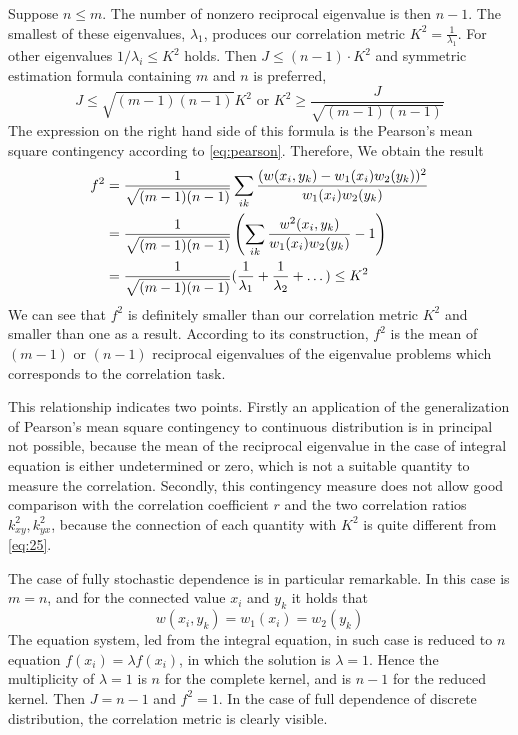 \documentclass{article}
\begin{document}
Suppose $n\leq m$. The number of nonzero reciprocal eigenvalue is
then $n-1$.
The smallest of these eigenvalues, $\lambda_1$,
produces our correlation metric $K^2 = \frac{1}{\lambda_1}$.
For other eigenvalues $1/\lambda_i \leq K^2$ holds. Then $J \leq (n-1)\cdot K^2$ and symmetric estimation formula containing $m$ and $n$ is preferred,
$$
J \leq \sqrt{(m-1)(n-1)} K^2 \textrm{ or } K^2 \geq \frac{J}{\sqrt{(m-1)(n-1)} }
$$
The expression on the right hand side of this formula is the Pearson's
mean square contingency according to \eqref{eq:pearson}. Therefore, We obtain the result
\begin{align}
       f^2 &= \frac{1}{\sqrt{(m-1)(n-1)}}\sum_{ik}
   \frac{(w(x_i,y_k)-w_1(x_i)w_2(y_k))^2}{w_1(x_i)w_2(y_k)} \notag \\
   &=\frac{1}{\sqrt{(m-1)(n-1)}}\left(\sum_{ik}
   \frac{w^2(x_i,y_k)}{w_1(x_i)w_2(y_k)} -1\right) \label{eq:25} \\
   &=\frac{1}{\sqrt{(m-1)(n-1)}}(\frac{1}{\lambda_1}
   + \frac{1}{\lambda_2} + \dots ) \leq K^2 \notag
\end{align}
We can see that $f^2$ is definitely smaller than our correlation
metric $K^2$ and smaller than one as a result. According to its
construction, $f^2$
is the mean of $(m-1)$ or $(n-1)$ reciprocal eigenvalues of the eigenvalue
problems which corresponds to the correlation task.

This relationship indicates two points. Firstly an application
of the generalization of Pearson's mean square contingency
to continuous distribution is in principal not possible, because
the mean of the reciprocal eigenvalue in the case of
integral equation is either undetermined or zero, which is
not a suitable quantity to measure the correlation.
Secondly, this contingency measure does not allow good comparison with the correlation coefficient
$r$ and the two correlation ratios $k^2_{xy}, k^2_{yx}$, because
the connection of each quantity with $K^2$ is quite 
different from \eqref{eq:25}.

The case of fully stochastic dependence is in particular remarkable.
In this case is $m=n$,
and for the connected value $x_i$
and $y_k$ it holds that
$$
w(x_i, y_k) = w_1(x_i)
= w_2(y_k)
$$
The equation system, led from the integral equation, in such case is reduced 
to $n$ equation $f(x_i) = \lambda f(x_i)$, in which
the solution is $\lambda=1$.
Hence the multiplicity of $\lambda=1$ is $n$ for the complete
kernel, and is $n-1$ for the reduced kernel. Then $J=n-1$
and $f^2=1$. In the case of full dependence of discrete distribution, the correlation metric is clearly visible.
\end{document}
